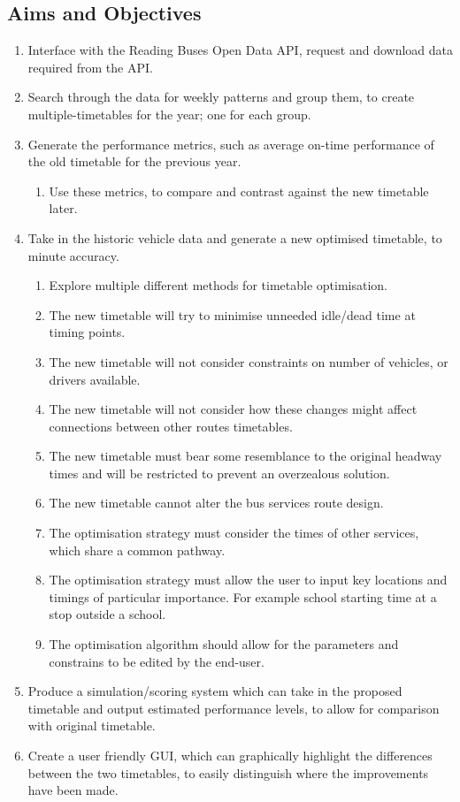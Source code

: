 \documentclass{article}
\begin{document}
\subsection{Aims and Objectives}
\begin{enumerate}
	\item Interface with the Reading Buses Open Data API, request and download data required from the API.
	\item Search through the data for weekly patterns and group them, to create multiple-timetables for the year; one for each group.
	\item Generate the performance metrics, such as average on-time performance of the old timetable for the previous year.
	\begin{enumerate}
		\item Use these metrics, to compare and contrast against the new timetable later. 
	\end{enumerate}
	\item Take in the historic vehicle data and generate a new optimised timetable, to minute accuracy.
	\begin{enumerate}
		\item Explore multiple different methods for timetable optimisation.
		\item The new timetable will try to minimise unneeded idle/dead time at timing points.	
		\item The new timetable will not consider constraints on number of vehicles, or drivers available. 
		\item The new timetable will not consider how these changes might affect connections between other routes timetables.
		\item The new timetable must bear some resemblance to the original headway times and will be restricted to prevent an overzealous solution.  
		\item The new timetable cannot alter the bus services route design.
		\item The optimisation strategy must consider the times of other services, which share a common pathway.
		\item The optimisation strategy must allow the user to input key locations and timings of particular importance. For example school starting time at a stop outside a school.
		\item The optimisation algorithm should allow for the parameters and constrains to be edited by the end-user.
	\end{enumerate}
	\item Produce a simulation/scoring system which can take in the proposed timetable and output estimated performance levels, to allow for comparison with original timetable.
	\item Create a user friendly GUI, which can graphically highlight the differences between the two timetables, to easily distinguish where the improvements have been made.  
\end{enumerate}
\end{document}
